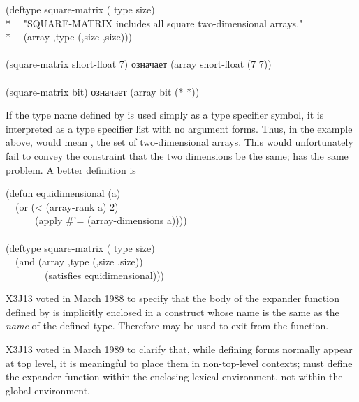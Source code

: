 \begin{defmac}
\begin{lisp}
(deftype square-matrix ( type size) \\*
~~"SQUARE-MATRIX includes all square two-dimensional arrays." \\*
~~{\Xbq}(array ,type (,size ,size))) \\
 \\
(square-matrix short-float 7)  \textrm{означает}  (array short-float (7 7)) \\
 \\
(square-matrix bit)  \textrm{означает}  (array bit (* *))
\end{lisp}
If the type name defined by  is used simply as a type
specifier symbol, it is interpreted as a type specifier list with
no argument forms.  Thus, in the example above, 
would mean , the set of two-dimensional arrays.
This would unfortunately fail to convey the constraint that the two
dimensions be the same;  has the same problem.
A better definition is
\begin{lisp}
(defun equidimensional (a) \\
~~(or (< (array-rank a) 2) \\
~~~~~~(apply \#'= (array-dimensions a)))) \\
 \\
(deftype square-matrix ( type size) \\
~~{\Xbq}(and (array ,type (,size ,size)) \\
~~~~~~~~(satisfies equidimensional)))
\end{lisp}

\begin{newer}
X3J13 voted in March 1988 
to specify that the body of the expander function defined
by  is implicitly enclosed in a  construct
whose name is the same as the \emph{name} of the defined type.
Therefore  may be used to exit from the function.
\end{newer}

\begin{newer}
X3J13 voted in March 1989 
to clarify that, while defining forms normally appear at top level,
it is meaningful to place them in non-top-level contexts;
 must define the expander function
within the enclosing lexical environment, not within the global
environment.
\end{newer}

\end{defmac}

